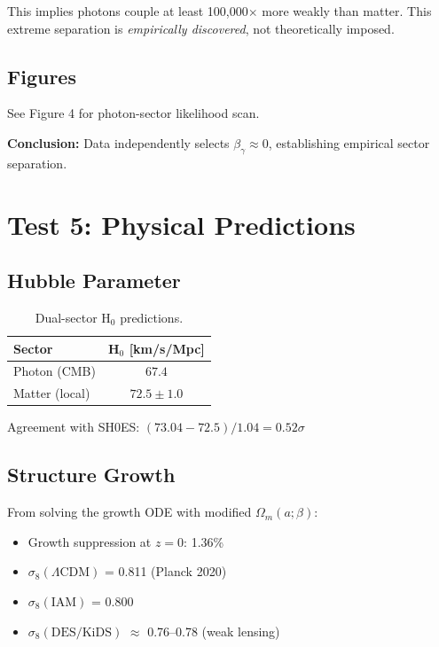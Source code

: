 \documentclass[11pt,letterpaper]{article}
\begin{document}
\noindent This implies photons couple at least 100,000$\times$ more weakly than matter. This extreme separation is \textit{empirically discovered}, not theoretically imposed.

\subsection{Figures}

See Figure 4 for photon-sector likelihood scan.

\noindent\textbf{Conclusion:} Data independently selects $\beta_\gamma \approx 0$, establishing empirical sector separation.

\section{Test 5: Physical Predictions}

\subsection{Hubble Parameter}

\begin{table}[h]
\centering
\begin{tabular}{lc}
\toprule
Sector & H$_0$ [km/s/Mpc] \\
\midrule
Photon (CMB) & $67.4$ \\
Matter (local) & $72.5 \pm 1.0$ \\
\bottomrule
\end{tabular}
\caption{Dual-sector H$_0$ predictions.}
\end{table}

\noindent Agreement with SH0ES: $(73.04 - 72.5)/1.04 = 0.52\sigma$

\subsection{Structure Growth}

From solving the growth ODE with modified $\Omega_m(a; \beta)$:

\begin{itemize}
\item Growth suppression at $z=0$: 1.36\%
\item $\sigma_8(\Lambda\text{CDM})$ = 0.811 (Planck 2020)
\item $\sigma_8(\text{IAM})$ = 0.800
\item $\sigma_8(\text{DES/KiDS})$ $\approx$ 0.76--0.78 (weak lensing)
\end{itemize}
\end{document}
